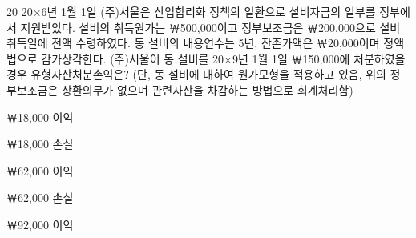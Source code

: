 \begin{question}{20}
20×6년 1월 1일 (주)서울은 산업합리화 정책의 일환으로 설비자금의 일부를 정부에서 지원받았다. 설비의 취득원가는 ￦500,000이고 정부보조금은 ￦200,000으로 설비취득일에 전액 수령하였다. 동 설비의 내용연수는 5년, 잔존가액은 ￦20,000이며 정액법으로 감가상각한다. (주)서울이 동 설비를 20×9년 1월 1일 ￦150,000에 처분하였을 경우 유형자산처분손익은? (단, 동 설비에 대하여 원가모형을 적용하고 있음, 위의 정부보조금은 상환의무가 없으며 관련자산을 차감하는 방법으로 회계처리함)
\begin{choices}
  \item ￦18,000 이익
  \item ￦18,000 손실
  \item ￦62,000 이익
  \item ￦62,000 손실
  \item ￦92,000 이익
\end{choices}
\end{question}
